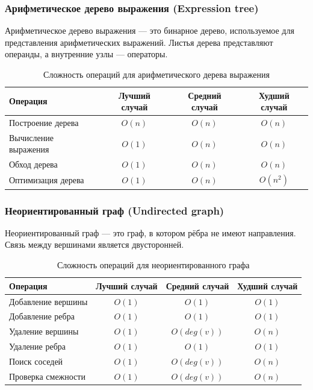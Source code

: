 \documentclass[a4paper,12pt]{article}
\begin{document}
\subsubsection{Арифметическое дерево выражения (Expression tree)}
\label{subsubsec:арифметическое-дерево-выражения-expression-tree}

Арифметическое дерево выражения --- это бинарное дерево, используемое для представления арифметических выражений. Листья дерева представляют операнды, а внутренние узлы --- операторы.

\begin{table}[H]
    \centering
    \begin{tabular}{|l|c|c|c|}
        \hline
        Операция & Лучший случай & Средний случай & Худший случай \\
        \hline
        Построение дерева & $O(n)$ & $O(n)$ & $O(n)$ \\
        \hline
        Вычисление выражения & $O(1)$ & $O(n)$ & $O(n)$ \\
        \hline
        Обход дерева & $O(1)$ & $O(n)$ & $O(n)$ \\
        \hline
        Оптимизация дерева & $O(1)$ & $O(n)$ & $O(n^2)$ \\
        \hline
    \end{tabular}
    \caption{Сложность операций для арифметического дерева выражения}
\end{table}

\subsubsection{Неориентированный граф (Undirected graph)}
\label{subsubsec:неориентированный-граф-undirected-graph}

Неориентированный граф --- это граф, в котором рёбра не имеют направления. Связь между вершинами является двусторонней.

\begin{table}[H]
    \centering
    \begin{tabular}{|l|c|c|c|}
        \hline
        Операция & Лучший случай & Средний случай & Худший случай \\
        \hline
        Добавление вершины & $O(1)$ & $O(1)$ & $O(1)$ \\
        \hline
        Добавление ребра & $O(1)$ & $O(1)$ & $O(1)$ \\
        \hline
        Удаление вершины & $O(1)$ & $O(deg(v))$ & $O(n)$ \\
        \hline
        Удаление ребра & $O(1)$ & $O(1)$ & $O(1)$ \\
        \hline
        Поиск соседей & $O(1)$ & $O(deg(v))$ & $O(n)$ \\
        \hline
        Проверка смежности & $O(1)$ & $O(deg(v))$ & $O(n)$ \\
        \hline
    \end{tabular}
    \caption{Сложность операций для неориентированного графа}
\end{table}
\end{document}
